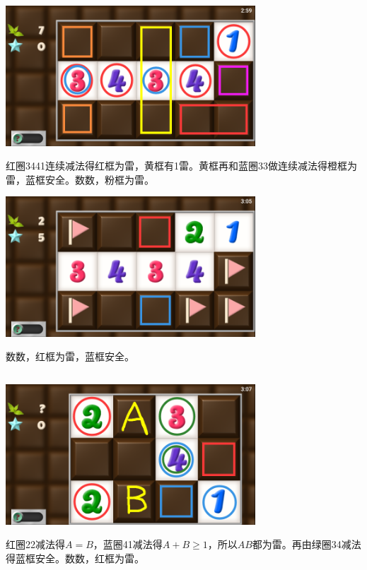 \subsection{} %
\begin{center}
    \includegraphics[width=0.7\textwidth]{puzzle/37-1.png}
\end{center}
红圈3441连续减法得红框为雷，黄框有1雷。黄框再和蓝圈33做连续减法得橙框为雷，蓝框安全。数数，粉框为雷。
\begin{center}
    \includegraphics[width=0.7\textwidth]{puzzle/37-2.png}
\end{center}
数数，红框为雷，蓝框安全。

\subsection{} %
\begin{center}
    \includegraphics[width=0.7\textwidth]{puzzle/38-1.png}
\end{center}
红圈22减法得$A=B$，蓝圈41减法得$A+B\ge 1$，所以$AB$都为雷。再由绿圈34减法得蓝框安全。数数，红框为雷。

